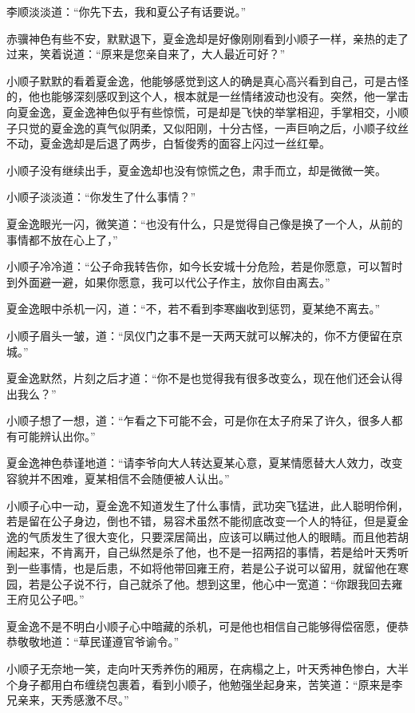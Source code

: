 李顺淡淡道：“你先下去，我和夏公子有话要说。”

赤骥神色有些不安，默默退下，夏金逸却是好像刚刚看到小顺子一样，亲热的走了过来，笑着说道：“原来是您亲自来了，大人最近可好？”

小顺子默默的看着夏金逸，他能够感觉到这人的确是真心高兴看到自己，可是古怪的，他也能够深刻感叹到这个人，根本就是一丝情绪波动也没有。突然，他一掌击向夏金逸，夏金逸神色似乎有些惊慌，可是却是飞快的举掌相迎，手掌相交，小顺子只觉的夏金逸的真气似阴柔，又似阳刚，十分古怪，一声巨响之后，小顺子纹丝不动，夏金逸却是后退了两步，白皙俊秀的面容上闪过一丝红晕。

小顺子没有继续出手，夏金逸却也没有惊慌之色，肃手而立，却是微微一笑。

小顺子淡淡道：“你发生了什么事情？”

夏金逸眼光一闪，微笑道：“也没有什么，只是觉得自己像是换了一个人，从前的事情都不放在心上了，”

小顺子冷冷道：“公子命我转告你，如今长安城十分危险，若是你愿意，可以暂时到外面避一避，如果你愿意，我可以代公子作主，放你自由离去。”

夏金逸眼中杀机一闪，道：“不，若不看到李寒幽收到惩罚，夏某绝不离去。”

小顺子眉头一皱，道：“凤仪门之事不是一天两天就可以解决的，你不方便留在京城。”

夏金逸默然，片刻之后才道：“你不是也觉得我有很多改变么，现在他们还会认得出我么？”

小顺子想了一想，道：“乍看之下可能不会，可是你在太子府呆了许久，很多人都有可能辨认出你。”

夏金逸神色恭谨地道：“请李爷向大人转达夏某心意，夏某情愿替大人效力，改变容貌并不困难，夏某相信不会随便被人认出。”

小顺子心中一动，夏金逸不知道发生了什么事情，武功突飞猛进，此人聪明伶俐，若是留在公子身边，倒也不错，易容术虽然不能彻底改变一个人的特征，但是夏金逸的气质发生了很大变化，只要深居简出，应该可以瞒过他人的眼睛。而且他若胡闹起来，不肯离开，自己纵然是杀了他，也不是一招两招的事情，若是给叶天秀听到一些事情，也是后患，不如将他带回雍王府，若是公子说可以留用，就留他在寒园，若是公子说不行，自己就杀了他。想到这里，他心中一宽道：“你跟我回去雍王府见公子吧。”

夏金逸不是不明白小顺子心中暗藏的杀机，可是他也相信自己能够得偿宿愿，便恭恭敬敬地道：“草民谨遵官爷谕令。”

小顺子无奈地一笑，走向叶天秀养伤的厢房，在病榻之上，叶天秀神色惨白，大半个身子都用白布缠绕包裹着，看到小顺子，他勉强坐起身来，苦笑道：“原来是李兄亲来，天秀感激不尽。”

